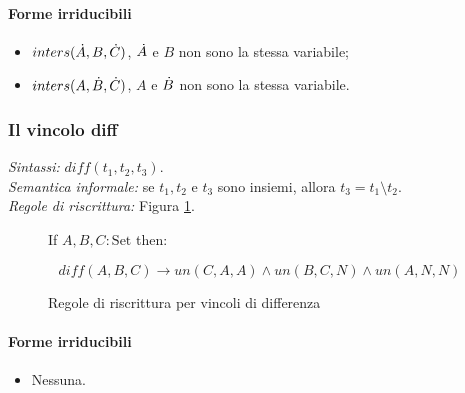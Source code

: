 \documentclass[12pt,a4paper,openright]{book}  %
\begin{document}
\paragraph{Forme irriducibili}
\begin{itemize}
	\item $inters(\dot{A}, B, \dot{C})$, $\dot{A}$ e $B$ non sono la stessa variabile;
	\item $inters(A, \dot{B}, \dot{C})$, $A$ e $\dot{B}$ non sono la stessa variabile.
\end{itemize}


\subsubsection{Il vincolo diff}

\textit{Sintassi:} $diff(t_1,t_2,t_3)$.\\
\noindent\textit{Semantica informale:} se $t_1, t_2$ e $t_3$ sono insiemi, allora $t_3 = t_1 \setminus t_2$.\\
\noindent\textit{Regole di riscrittura:} Figura \ref{fig:difference_constraints}.

\begin{figure}
	\begin{tcolorbox}[colframe=black, colback=white, sharp corners]
		\setcounter{equation}{0}
		\renewcommand{\theequation}{\textsubscript{\arabic{equation}}}

		If $A, B, C: \text{Set}$ then:

		\begin{equation}
		diff(A,B,C) \to un(C,A,A) \land un(B,C,N) \land un(A,N,N)
		\end{equation}

	\end{tcolorbox}

	\caption{Regole di riscrittura per vincoli di differenza}
	\label{fig:difference_constraints}
\end{figure}

\paragraph{Forme irriducibili}
\begin{itemize}
	\item Nessuna.
\end{itemize}
\end{document}
